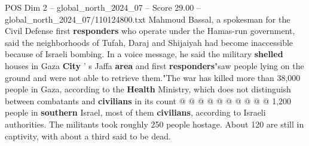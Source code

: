 \begin{textsample}{POS Dim 2 – global\_north\_2024\_07 – Score 29.00 – global\_north\_2024\_07/110124800.txt}
Mahmoud Bassal, a spokesman for the Civil Defense first \textbf{responders} who operate under the Hamas-run government, said the neighborhoods of Tufah, Daraj and Shijaiyah had become inaccessible because of Israeli bombing.
In a voice message, he said the military \textbf{shelled} houses in Gaza \textbf{City} ' s Jaffa \textbf{area} and first \textbf{responders}"saw people lying on the ground and were not able to retrieve them."The war has killed more than 38,000 people in Gaza, according to the \textbf{Health} Ministry, which does not distinguish between combatants and \textbf{civilians} in its count @ @ @ @ @ @ @ @ @ @ 1,200 people in \textbf{southern} Israel, most of them \textbf{civilians}, according to Israeli authorities.
The militants took roughly 250 people hostage.
About 120 are still in captivity, with about a third said to be dead.

\end{textsample}
